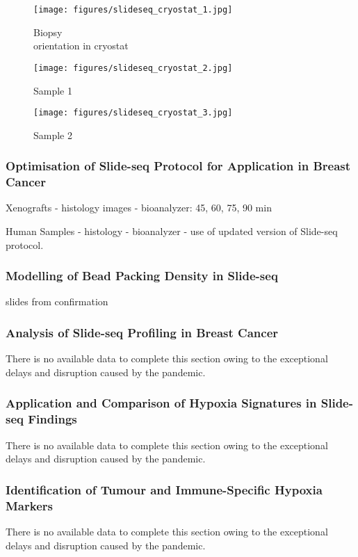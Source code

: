 \begin{figure}[!htb]
		\left
		\texttt{[image: figures/slideseq\_cryostat\_1.jpg]} \hfill
		\caption[Biopsy orientation in cryostat]{Biopsy \\ orientation in cryostat}
		\label{fig:slideseq_cryostat_1}
	\endminipage\hfill
		\centering
		\texttt{[image: figures/slideseq\_cryostat\_2.jpg]} \hfill
		\caption[Sample 1]{Sample 1}
		\label{fig:slideseq_cryostat_2}
	\endminipage\hfill
		\centering
		\texttt{[image: figures/slideseq\_cryostat\_3.jpg]} \hfill
		\caption[Sample 2]{Sample 2}
		\label{fig:slideseq_cryostat_3}
	\endminipage
\end{figure}




\subsubsection{Optimisation of Slide-seq Protocol for Application in Breast Cancer}

Xenografts
- histology images
- bioanalyzer: 45, 60, 75, 90 min


Human Samples
- histology
- bioanalyzer
- use of updated version of Slide-seq protocol.


\subsubsection{Modelling of Bead Packing Density in Slide-seq}
slides from confirmation

\subsubsection{Analysis of Slide-seq Profiling in Breast Cancer}
There is no available data to complete this section owing to the exceptional delays and disruption caused by the pandemic. 

\subsubsection{Application and Comparison of Hypoxia Signatures in Slide-seq Findings}
There is no available data to complete this section owing to the exceptional delays and disruption caused by the pandemic. 

\subsubsection{Identification of Tumour and Immune-Specific Hypoxia Markers}
There is no available data to complete this section owing to the exceptional delays and disruption caused by the pandemic. 

